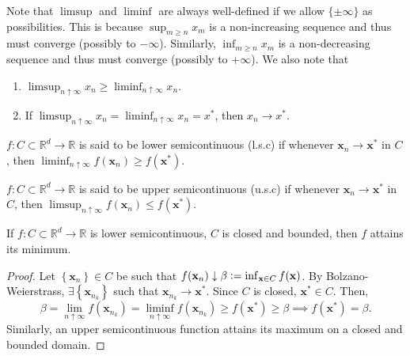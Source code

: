 Note that $\limsup$ and $\liminf$ are always well-defined if we allow $\{\pm\infty\}$ as possibilities. This is because $\sup_{m \geq n} x_m$ is a non-increasing sequence and thus must converge (possibly to $-\infty$). Similarly, $\inf_{m \geq n} x_m$ is a non-decreasing sequence and thus must converge (possibly to $+\infty$). We also note that

\begin{enumerate}
    \item $\displaystyle \limsup_{n \uparrow \infty} x_n \geq \liminf_{n \uparrow \infty} x_n$.

    \item If $\displaystyle \limsup_{n \uparrow \infty} x_n = \liminf_{n \uparrow \infty} x_n = x^*$, then $x_n \to x^*$. 
\end{enumerate}

\begin{defn}
    $f \colon C \subset \mathbb{R}^d \to \mathbb{R}$ is said to be lower semicontinuous (l.s.c) if whenever $\mathbf{x}_n \to \mathbf{x}^*$ in $C$, then $\displaystyle \liminf_{n \uparrow \infty} f(\mathbf{x}_n) \geq f(\mathbf{x}^*)$. 

    $f \colon C \subset \mathbb{R}^d \to \mathbb{R}$ is said to be upper semicontinuous (u.s.c) if whenever $\mathbf{x}_n \to \mathbf{x}^*$ in $C$, then $\displaystyle \limsup_{n \uparrow \infty} f(\mathbf{x}_n) \leq f(\mathbf{x}^*)$. 
\end{defn}

\begin{cor}
    If $f \colon C \subset \mathbb{R}^d \to \mathbb{R}$ is lower semicontinuous, $C$ is closed and bounded, then $f$ attains its minimum.
\end{cor}
\begin{proof}
    Let $\left\{ \mathbf{x}_n \right\} \in C$ be such that $f(\mathbf{x}_n) \downarrow \beta \vcentcolon= \inf_{\mathbf{x} \in C} f(\mathbf{x})$. By Bolzano-Weierstrass, $\exists \left\{ \mathbf{x}_{n_k} \right\}$ such that $\mathbf{x}_{n_k} \to \mathbf{x}^*$. Since $C$ is closed, $\mathbf{x}^* \in C$. Then, 
    \[
        \beta = \lim_{n \uparrow \infty} f(\mathbf{x}_{n_k}) = \liminf_{n \uparrow \infty} f(\mathbf{x}_{n_k}) \geq f(\mathbf{x}^*) \geq \beta \implies f(\mathbf{x}^*) = \beta.
    \]
    Similarly, an upper semicontinuous function attains its maximum on a closed and bounded domain.
\end{proof}

